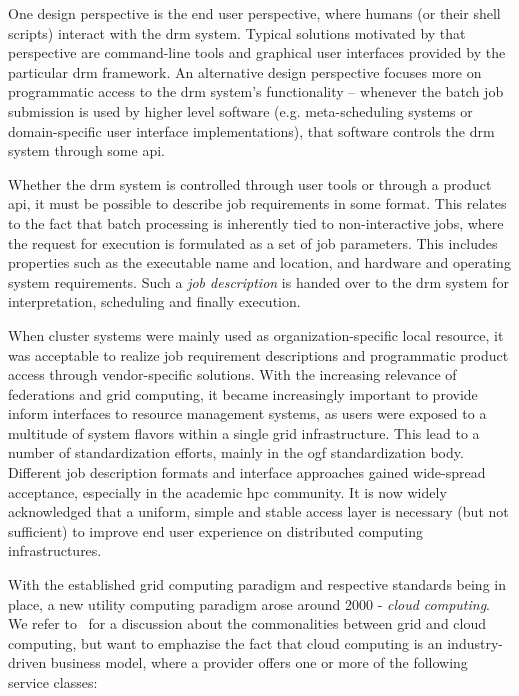 \documentclass[twocolumn]{svjour3}       %
\begin{document}
One design perspective is the end user perspective, where humans (or their shell scripts) interact with the \gls{drm} system. Typical solutions motivated by that perspective are command-line tools and graphical user interfaces provided by the particular \gls{drm} framework. An alternative design perspective focuses more on programmatic access to the \gls{drm} system's functionality -- whenever the batch job submission is used by higher level software (e.g. meta-scheduling systems or domain-specific user interface implementations), that software controls the \gls{drm} system through some \gls{api}.

Whether the \gls{drm} system is controlled through user tools or through a product \gls{api}, it must be possible to describe job requirements in some format. This relates to the fact that batch processing is inherently tied to non-interactive jobs, where the request for execution is formulated as a set of job parameters. This includes properties such as the executable name and location, and hardware and operating system requirements. Such a \emph{job description} is handed over to the \gls{drm} system for interpretation, scheduling and finally execution. 

When cluster systems were mainly used as organization-specific local resource, it was acceptable to realize job requirement descriptions and programmatic product access through vendor-specific solutions. With the increasing relevance of federations and grid computing, it became increasingly important to provide inform interfaces to resource management systems, as users were exposed to a multitude of system flavors within a single grid infrastructure. This lead to a number of standardization efforts, mainly in the \gls{ogf} standardization body. Different job description formats and interface approaches gained wide-spread acceptance, especially in the academic \gls{hpc} community. It is now widely acknowledged that a uniform, simple and stable access layer is necessary (but not sufficient) to improve end user experience on distributed computing infrastructures.

With the established grid computing paradigm and respective standards being in place, a new utility computing paradigm arose around 2000 - \emph{cloud computing}. We refer to~\cite{citemaster_9642} for a discussion about the commonalities between grid and cloud computing, but want to emphazise the fact that cloud computing is an industry-driven business model, where a provider offers one or more of the following service classes:
\end{document}
